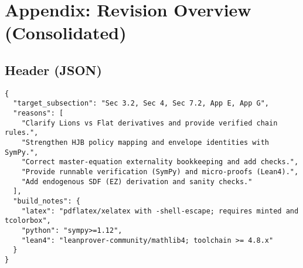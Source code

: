 ﻿\documentclass[11pt,letterpaper,oneside]{article}
\numberwithin{equation}{section}
\newcommand{\1}{\mathbf{1}}
\begin{document}
\section*{Appendix: Revision Overview (Consolidated)}

\subsection*{Header (JSON)}
\begin{tcolorbox}[sympycheckstyle,title={Editorial Header (JSON)}]
\begin{Verbatim}[fontsize=\small]
{
  "target_subsection": "Sec 3.2, Sec 4, Sec 7.2, App E, App G",
  "reasons": [
    "Clarify Lions vs Flat derivatives and provide verified chain rules.",
    "Strengthen HJB policy mapping and envelope identities with SymPy.",
    "Correct master-equation externality bookkeeping and add checks.",
    "Provide runnable verification (SymPy) and micro-proofs (Lean4).",
    "Add endogenous SDF (EZ) derivation and sanity checks."
  ],
  "build_notes": {
    "latex": "pdflatex/xelatex with -shell-escape; requires minted and tcolorbox",
    "python": "sympy>=1.12",
    "lean4": "leanprover-community/mathlib4; toolchain >= 4.8.x"
  }
}
\end{Verbatim}
\end{tcolorbox}
\end{document}
